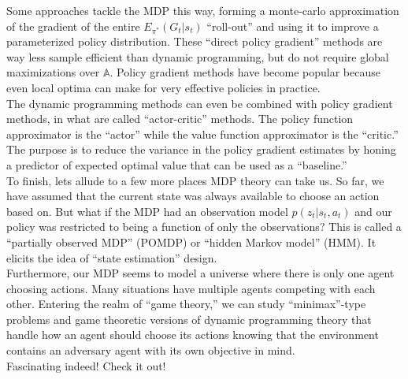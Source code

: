 Some approaches tackle the MDP this way, forming a monte-carlo approximation of the gradient of the entire $E_{\pi^*}(G_t | s_t)$ ``roll-out'' and using it to improve a parameterized policy distribution. These ``direct policy gradient'' methods are way less sample efficient than dynamic programming, but do not require global maximizations over $\mathbb{A}$. Policy gradient methods have become popular because even local optima can make for very effective policies in practice.\\

The dynamic programming methods can even be combined with policy gradient methods, in what are called ``actor-critic'' methods. The policy function approximator is the ``actor'' while the value function approximator is the ``critic.'' The purpose is to reduce the variance in the policy gradient estimates by honing a predictor of expected optimal value that can be used as a ``baseline.''\\

To finish, lets allude to a few more places MDP theory can take us. So far, we have assumed that the current state was always available to choose an action based on. But what if the MDP had an observation model $p(z_t|s_t,a_t)$ and our policy was restricted to being a function of only the observations? This is called a ``partially observed MDP'' (POMDP) or ``hidden Markov model'' (HMM). It elicits the idea of ``state estimation'' design.\\

Furthermore, our MDP seems to model a universe where there is only one agent choosing actions. Many situations have multiple agents competing with each other. Entering the realm of ``game theory,'' we can study ``minimax''-type problems and game theoretic versions of dynamic programming theory that handle how an agent should choose its actions knowing that the environment contains an adversary agent with its own objective in mind.\\

Fascinating indeed! Check it out!\\



